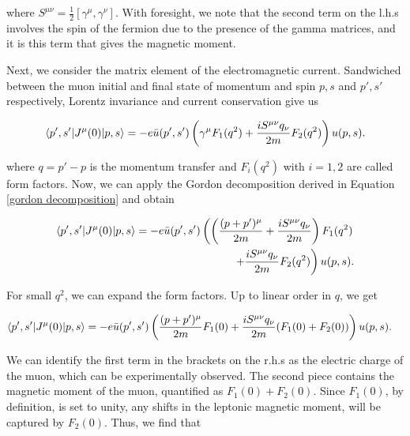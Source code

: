 \documentclass{article}
\numberwithin{equation}{section} %
\begin{document}
\noindent where $S^{\mu\nu} = \frac{1}{2}[\gamma^\mu,\gamma^\nu]$. With foresight\cite{zee}, we note that the second term on the l.h.s involves the spin of the fermion due to the presence of the gamma matrices, and it is this term that gives the magnetic moment.

Next, we consider the matrix element of the electromagnetic current. Sandwiched between the muon initial and final state of momentum and spin $p,s$ and $p',s'$ respectively, Lorentz invariance and current conservation give us

\begin{equation}
\mathinner{\langle{p',s'|J^\mu(0)|p,s}\rangle} = -e\bar{u}(p',s')\left( \gamma^\mu F_1(q^2) + \frac{iS^{\mu\nu}q_\nu}{2m}F_2(q^2) \right)u(p,s).
\end{equation}

\noindent where $q = p'-p$ is the momentum transfer and $F_i(q^2)$ with $i=1,2$ are called form factors. Now, we can apply the Gordon decomposition derived in Equation \ref{gordon decomposition} and obtain

\begin{equation}
\begin{split}
\mathinner{\langle{p',s'|J^\mu(0)|p,s}\rangle} = -e\bar{u}(p',s')\left( \left( \frac{(p+p')^\mu }{2m} + \frac{iS^{\mu\nu}q_\nu}{2m} \right) F_1(q^2)\right.&\\
\left. + \frac{iS^{\mu\nu}q_\nu}{2m}F_2(q^2) \right)u(p,s).&
\end{split}
\label{em current}
\end{equation}

For small $q^2$, we can expand the form factors. Up to linear order in $q$, we get

\begin{equation}
\begin{split}
\mathinner{\langle{p',s'|J^\mu(0)|p,s}\rangle} = -e\bar{u}(p',s')\left( \frac{(p+p')^\mu }{2m} F_1(0) + \frac{iS^{\mu\nu}q_\nu}{2m}(F_1(0)+F_2(0)) \right)u(p,s).&
\end{split}
\label{em current with amu encoded}
\end{equation}

We can identify the first term in the brackets on the r.h.s as the electric charge\cite{zee} of the muon, which can be experimentally observed. The second piece contains the magnetic moment of the muon, quantified as $F_1(0) + F_2(0)$. Since $F_1(0)$, by definition, is set to unity, any shifts in the leptonic magnetic moment, will be captured by $F_2(0)$. Thus, we find that \cite{blum}
\end{document}
